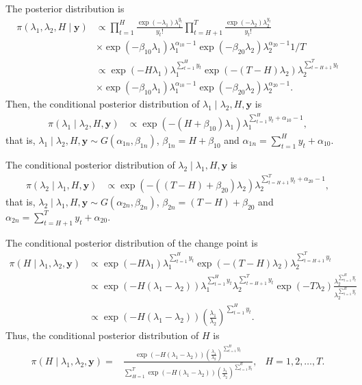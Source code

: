 The posterior distribution is
\begin{align*}
	\pi(\lambda_1,\lambda_2,H\mid \bm{y})&\propto \prod_{t=1}^{H} \frac{\exp(-\lambda_1)\lambda_1^{y_t}}{y_t!} \prod_{t=H+1}^{T}\frac{\exp(-\lambda_2)\lambda_2^{y_t}}{y_t!}\\
	&\times \exp(-\beta_{10}\lambda_1)\lambda_1^{\alpha_{10}-1} \exp(-\beta_{20}\lambda_2)\lambda_2^{\alpha_{20}-1} 1/T\\
	&\propto\exp(-H\lambda_1)\lambda_1^{\sum_{t=1}^H y_t}\exp(-(T-H)\lambda_2)\lambda_2^{\sum_{t=H+1}^T y_t}\\
	&\times \exp(-\beta_{10}\lambda_1)\lambda_1^{\alpha_{10}-1} \exp(-\beta_{20}\lambda_2)\lambda_2^{\alpha_{20}-1}.
\end{align*} 
Then, the conditional posterior distribution of $\lambda_1\mid \lambda_2,H,\bm{y}$ is 
\begin{align*}
	\pi(\lambda_1\mid \lambda_2,H,\bm{y})&\propto\exp(-(H+\beta_{10})\lambda_1)\lambda_1^{\sum_{t=1}^H y_t+\alpha_{10}-1},
\end{align*} 
that is, $\lambda_1\mid \lambda_2,H,\bm{y}\sim G(\alpha_{1n},\beta_{1n})$, $\beta_{1n}=H+\beta_{10}$ and $\alpha_{1n}=\sum_{t=1}^H y_t+\alpha_{10}$.

The conditional posterior distribution of $\lambda_2\mid \lambda_1,H,\bm{y}$ is 
\begin{align*}
	\pi(\lambda_2\mid \lambda_1,H,\bm{y})&\propto\exp(-((T-H)+\beta_{20})\lambda_2)\lambda_2^{\sum_{t=H+1}^T y_t+\alpha_{20}-1},
\end{align*} 
that is, $\lambda_2\mid \lambda_1,H,\bm{y}\sim G(\alpha_{2n},\beta_{2n})$, $\beta_{2n}=(T-H)+\beta_{20}$ and $\alpha_{2n}=\sum_{t=H+1}^T y_t+\alpha_{20}$.

The conditional posterior distribution of the change point is
\begin{align*}
	\pi(H\mid \lambda_1,\lambda_2,\bm{y})&\propto\exp(-H\lambda_1)\lambda_1^{\sum_{t=1}^H y_t}\exp(-(T-H)\lambda_2)\lambda_2^{\sum_{t=H+1}^T y_t}\\
	&\propto \exp(-H(\lambda_1-\lambda_2))\lambda_1^{\sum_{t=1}^H y_t}\lambda_2^{\sum_{t=H+1}^T y_t} \exp(-T\lambda_2) \frac{\lambda_2^{\sum_{t=1}^H y_t}}{\lambda_2^{\sum_{t=1}^H y_t}}\\
	&\propto \exp(-H(\lambda_1-\lambda_2))\left(\frac{\lambda_1}{\lambda_2}\right)^{\sum_{t=1}^H y_t}.
\end{align*} 
Thus, the conditional posterior distribution of $H$ is
\begin{align*}
	\pi(H\mid \lambda_1,\lambda_2,\bm{y})=& \frac{\exp(-H(\lambda_1-\lambda_2))\left(\frac{\lambda_1}{\lambda_2}\right)^{\sum_{t=1}^H y_t}}{\sum_{H=1}^T \exp(-H(\lambda_1-\lambda_2))\left(\frac{\lambda_1}{\lambda_2}\right)^{\sum_{t=1}^H y_t}}, & H=1,2,\dots,T.
\end{align*}

